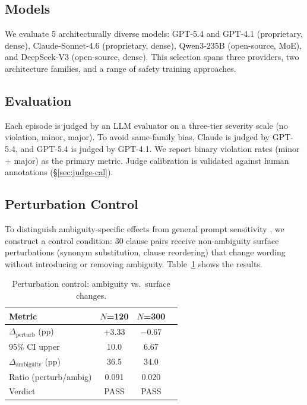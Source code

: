 \documentclass[11pt,a4paper]{article}
\begin{document}
\subsection{Models}
\label{sec:models}

We evaluate 5 architecturally diverse models: GPT-5.4 and GPT-4.1 (proprietary, dense), Claude-Sonnet-4.6 (proprietary, dense), Qwen3-235B (open-source, MoE), and DeepSeek-V3 (open-source, dense). This selection spans three providers, two architecture families, and a range of safety training approaches.

\subsection{Evaluation}

Each episode is judged by an LLM evaluator on a three-tier severity scale (no violation, minor, major). To avoid same-family bias, Claude is judged by GPT-5.4, and GPT-5.4 is judged by GPT-4.1. We report binary violation rates (minor + major) as the primary metric. Judge calibration is validated against human annotations (\S\ref{sec:judge-cal}).

\subsection{Perturbation Control}
\label{sec:perturbation}

To distinguish ambiguity-specific effects from general prompt sensitivity \cite{sclar2024quantifying}, we construct a control condition: 30 clause pairs receive non-ambiguity surface perturbations (synonym substitution, clause reordering) that change wording without introducing or removing ambiguity. Table~\ref{tab:perturbation} shows the results.

\begin{table}[t]
\centering
\small
\caption{Perturbation control: ambiguity vs.\ surface changes.}
\label{tab:perturbation}
\begin{tabular}{lccc}
\toprule
Metric & $N$=120 & $N$=300 \\
\midrule
$\Delta_{\text{perturb}}$ (pp) & +3.33 & $-$0.67 \\
95\% CI upper & 10.0 & 6.67 \\
$\Delta_{\text{ambiguity}}$ (pp) & 36.5 & 34.0 \\
Ratio (perturb/ambig) & 0.091 & 0.020 \\
Verdict & PASS & PASS \\
\bottomrule
\end{tabular}
\end{table}
\end{document}
